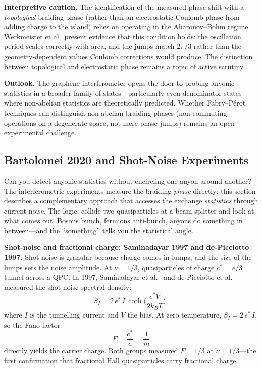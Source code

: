 \medskip
\noindent\textbf{Interpretive caution.}
The identification of the measured phase shift with a \emph{topological} braiding phase (rather than an electrostatic Coulomb phase from adding charge to the island) relies on operating in the Aharonov--Bohm regime.  Werkmeister et al.\ present evidence that this condition holds: the oscillation period scales correctly with area, and the jumps match $2\pi/3$ rather than the geometry-dependent values Coulomb corrections would produce.  The distinction between topological and electrostatic phase remains a topic of active scrutiny \cite{RosenowHalperinInterferometryPlaceholder}.

\medskip
\noindent\textbf{Outlook.}
The graphene interferometer opens the door to probing anyonic statistics in a broader family of states---particularly even-denominator states where non-abelian statistics are theoretically predicted.  Whether Fabry--P\'erot techniques can distinguish non-abelian braiding phases (non-commuting operations on a degenerate space, not mere phase jumps) remains an open experimental challenge.

\subsection{Bartolomei 2020 and Shot-Noise Experiments}
\label{subsec:bartolomei-shot-noise}

Can you detect anyonic statistics without encircling one anyon around another?  The interferometric experiments measure the braiding \emph{phase} directly; this section describes a complementary approach that accesses the exchange \emph{statistics} through current noise.  The logic: collide two quasiparticles at a beam splitter and look at what comes out.  Bosons bunch, fermions anti-bunch, anyons do something in between---and the ``something'' tells you the statistical angle.

\medskip
\noindent\textbf{Shot-noise and fractional charge: Saminadayar 1997 and de-Picciotto 1997.}
Shot noise is granular because charge comes in lumps, and the size of the lumps sets the noise amplitude.  At $\nu = 1/3$, quasiparticles of charge $e^{*} = e/3$ tunnel across a QPC.  In 1997, Saminadayar et al.\ \cite{Saminadayar1997FractionalCharge} and de-Picciotto et al.\ \cite{dePicciotto1997FractionalCharge} measured the shot-noise spectral density:
\begin{equation}
  S_I = 2\,e^{*}\,I\,\coth\!\Big(\frac{e^{*}V}{2k_BT}\Big),
  \label{eq:shot-noise-poisson}
\end{equation}
where $I$ is the tunnelling current and $V$ the bias.  At zero temperature, $S_I = 2\,e^{*}\,I$, so the Fano factor
\begin{equation}
  F = \frac{e^{*}}{e} = \frac{1}{m}
  \label{eq:fano-factor}
\end{equation}
directly yields the carrier charge.  Both groups measured $F = 1/3$ at $\nu = 1/3$---the first confirmation that fractional Hall quasiparticles carry fractional charge.

